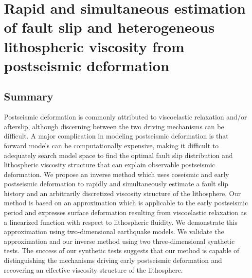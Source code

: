 \chapter{Rapid and simultaneous estimation of fault slip and heterogeneous lithospheric viscosity from postseismic deformation}

\section{Summary}
Postseismic deformation is commonly attributed to viscoelastic
relaxation and/or afterslip, although discerning between the two
driving mechanisms can be difficult.  A major complication in modeling
postseismic deformation is that forward models can be computationally
expensive, making it difficult to adequately search model space to
find the optimal fault slip distribution and lithospheric viscosity
structure that can explain observable postseismic deformation.  We
propose an inverse method which uses coseismic and early postseismic
deformation to rapidly and simultaneously estimate a fault slip
history and an arbitrarily discretized viscosity structure of the
lithosphere. Our method is based on an approximation which is
applicable to the early postseismic period and expresses surface
deformation resulting from viscoelastic relaxation as a linearized
function with respect to lithospheric fluidity.  We demonstrate this
approximation using two-dimensional earthquake models.  We validate
the approximation and our inverse method using two three-dimensional
synthetic tests. The success of our synthetic tests suggests that our
method is capable of distinguishing the mechanisms driving early
postseismic deformation and recovering an effective viscosity
structure of the lithosphere.


